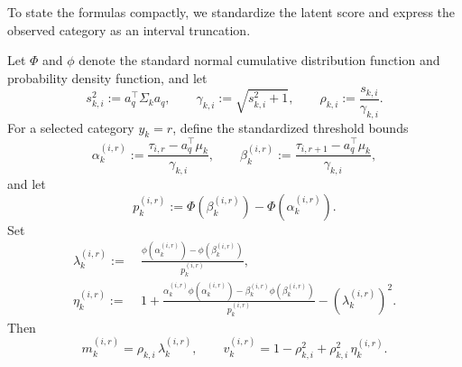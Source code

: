 \documentclass{article}
\begin{document}
To state the formulas compactly, we standardize the latent score and express the observed
category as an interval truncation.

\begin{corollary}
\label{cor:ordinal_coeffs}

Let $\Phi$ and $\phi$ denote the standard normal cumulative distribution function and probability
density function, and let
\begin{equation*}
s_{k,i}^2 := a_q^\top \Sigma_k a_q,
\qquad
\gamma_{k,i} := \sqrt{s_{k,i}^2+1},
\qquad
\rho_{k,i} := \frac{s_{k,i}}{\gamma_{k,i}}.
\end{equation*}
For a selected category $y_k = r$, define the standardized threshold bounds
\begin{equation*}
\alpha_k^{(i,r)} := \frac{\tau_{i,r} - a_q^\top \mu_k}{\gamma_{k,i}},
\qquad
\beta_k^{(i,r)} := \frac{\tau_{i,r+1} - a_q^\top \mu_k}{\gamma_{k,i}},
\end{equation*}
and let
\begin{equation*}
p_k^{(i,r)} := \Phi\!\left(\beta_k^{(i,r)}\right) - \Phi\!\left(\alpha_k^{(i,r)}\right).
\end{equation*}
Set
\begin{align*}
\lambda_k^{(i,r)} :=&\:
\frac{\phi\!\left(\alpha_k^{(i,r)}\right) - \phi\!\left(\beta_k^{(i,r)}\right)}{p_k^{(i,r)}},\\
\eta_k^{(i,r)} :=& \:
1 + \frac{\alpha_k^{(i,r)} \phi\!\left(\alpha_k^{(i,r)}\right)
- \beta_k^{(i,r)} \phi\!\left(\beta_k^{(i,r)}\right)}{p_k^{(i,r)}}
- \left(\lambda_k^{(i,r)}\right)^2.
\end{align*}
Then
\begin{equation*}
m_k^{(i,r)} = \rho_{k,i}\,\lambda_k^{(i,r)},
\qquad
v_k^{(i,r)} = 1 - \rho_{k,i}^2 + \rho_{k,i}^2\,\eta_k^{(i,r)}.
\end{equation*}
\end{corollary}
\end{document}
